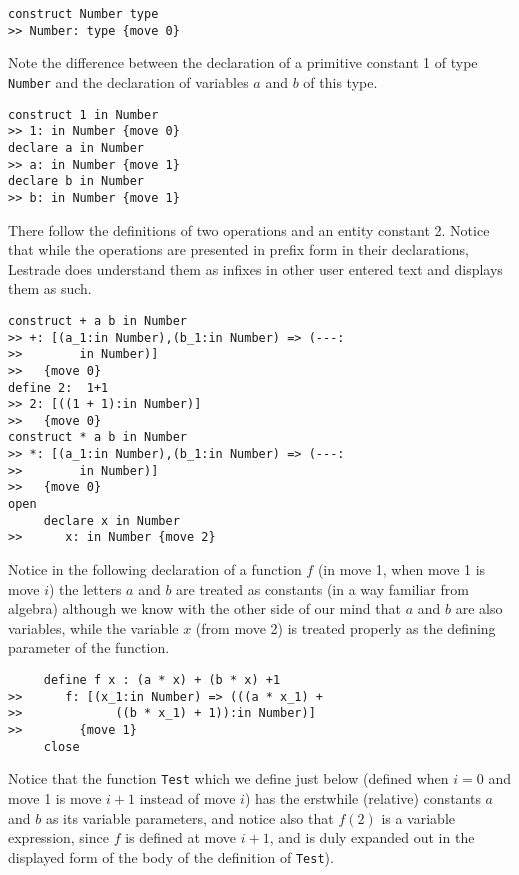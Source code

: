 \documentclass{article}
\begin{document}
\begin{verbatim}
construct Number type
>> Number: type {move 0}
\end{verbatim}

Note the difference between the declaration of a primitive constant 1 of type {\tt Number} and the declaration of variables $a$ and $b$ of this type.

\begin{verbatim}
construct 1 in Number
>> 1: in Number {move 0}
declare a in Number
>> a: in Number {move 1}
declare b in Number
>> b: in Number {move 1}
\end{verbatim}

There follow the definitions of two operations and an entity constant 2.  Notice that while
the operations are presented in prefix form in their declarations, Lestrade does understand them
as infixes in other user entered text and displays them as such.

\begin{verbatim}
construct + a b in Number
>> +: [(a_1:in Number),(b_1:in Number) => (---:
>>        in Number)]
>>   {move 0}
define 2:  1+1
>> 2: [((1 + 1):in Number)]
>>   {move 0}
construct * a b in Number
>> *: [(a_1:in Number),(b_1:in Number) => (---:
>>        in Number)]
>>   {move 0}
open
     declare x in Number
>>      x: in Number {move 2}
\end{verbatim}

Notice in the following  declaration of a function $f$ (in move 1, when move 1 is move $i$) the letters $a$ and $b$ are treated as constants (in a way familiar from algebra) although we know with the other side of our mind that $a$ and $b$ are also variables, while the variable $x$ (from move 2) is treated properly as the defining parameter of the function.

\begin{verbatim}
     define f x : (a * x) + (b * x) +1
>>      f: [(x_1:in Number) => (((a * x_1) + 
>>             ((b * x_1) + 1)):in Number)]
>>        {move 1}
     close
\end{verbatim}

 Notice that the function {\tt Test} which we define just below (defined when $i=0$ and move 1 is move $i+1$ instead of move $i$) has the erstwhile (relative) constants $a$ and $b$ as its variable parameters, and notice also that $f(2)$ is a variable expression, since $f$ is defined at move $i+1$, and is duly expanded out in the displayed form of the body of the definition of {\tt Test}).
\end{document}
